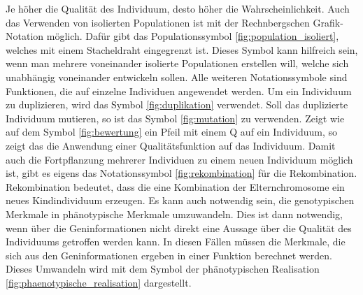 Je höher die Qualität des Individuum, desto höher die Wahrscheinlichkeit. Auch das Verwenden von isolierten Populationen ist mit der Rechnbergschen Grafik-Notation möglich. Dafür gibt das Populationssymbol \ref{fig:population_isoliert}, welches mit einem Stacheldraht eingegrenzt ist. Dieses Symbol kann hilfreich sein, wenn man mehrere voneinander isolierte Populationen erstellen will, welche sich unabhängig voneinander entwickeln sollen. Alle weiteren Notationssymbole sind Funktionen, die auf einzelne Individuen angewendet werden. Um ein Individuum zu duplizieren, wird das Symbol \ref{fig:duplikation} verwendet. Soll das duplizierte Individuum mutieren, so ist das Symbol \ref{fig:mutation} zu verwenden. Zeigt wie auf dem Symbol \ref{fig:bewertung} ein Pfeil mit einem Q auf ein Individuum, so zeigt das die Anwendung einer Qualitätsfunktion auf das Individuum. Damit auch die Fortpflanzung mehrerer Individuen zu einem neuen Individuum möglich ist, gibt es eigens das Notationssymbol \ref{fig:rekombination} für die Rekombination. Rekombination bedeutet, dass die eine Kombination der Elternchromosome ein neues Kindindividuum erzeugen.
Es kann auch notwendig sein, die genotypischen Merkmale in phänotypische Merkmale umzuwandeln. Dies ist dann notwendig, wenn über die Geninformationen nicht direkt eine Aussage über die Qualität des Individuums getroffen werden kann. In diesen Fällen müssen die Merkmale, die sich aus den Geninformationen ergeben in einer Funktion berechnet werden. Dieses Umwandeln wird mit dem Symbol der phänotypischen Realisation \ref{fig:phaenotypische_realisation} dargestellt.

